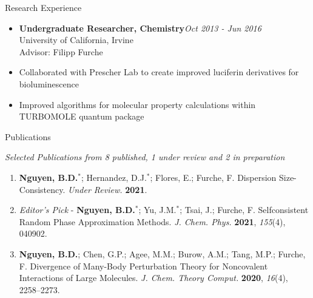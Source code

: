 \documentclass{resume} %
\begin{document}
\begin{rSection}{Research Experience}
\begin{itemize}
\item[] \textbf{Undergraduate Researcher, Chemistry}\hfill {\em Oct 2013 - Jun 2016}\\
  University of California, Irvine\\
  Advisor: Filipp Furche
\item Collaborated with Prescher Lab to create improved luciferin derivatives
  for bioluminescence
\item Improved algorithms for molecular property calculations within TURBOMOLE
  quantum package
\end{itemize}

\end{rSection}

\pagebreak
\begin{rSection}{Publications}

  \textit{Selected Publications from 8 published, 1 under review and
    2 in preparation}
  
\begin{enumerate}
\item \textbf{Nguyen, B.D.}$^*$; Hernandez, D.J.$^*$;
  Flores, E.; Furche, F. Dispersion Size-Consistency. \textit{Under Review.}
  \textbf{2021}.

\item {\em Editor's Pick} - \textbf{Nguyen, B.D.}$^*$; Yu, J.M.$^*$; Tsai, J.;
  Furche, F. Selfconsistent Random Phase Approximation Methods.
  \textit{J. Chem. Phys.} \textbf{2021}, \textit{155}(4), 040902.

%
      
\item \textbf{Nguyen, B.D.}; Chen, G.P.; Agee, M.M.; Burow, A.M.; Tang, M.P.;
  Furche, F. Divergence of Many-Body Perturbation Theory for Noncovalent Interactions
  of Large Molecules. \textit{J. Chem. Theory Comput.} \textbf{2020}, \textit{16}(4),
  2258--2273.


\end{enumerate}
\end{rSection}
\end{document}

